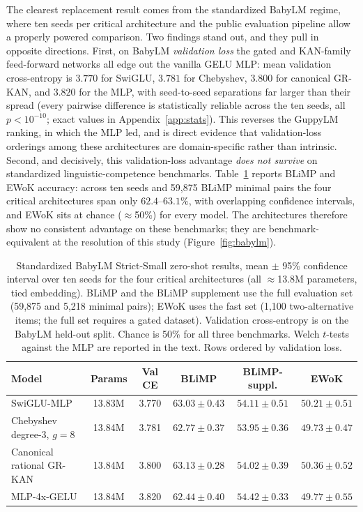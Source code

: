 \documentclass[11pt]{article}
\newcommand{\modelname}[1]{\textsc{#1}}
\newcommand{\grkan}{\modelname{GR-KAN}}
\begin{document}
The clearest replacement result comes from the standardized BabyLM regime, where ten seeds per critical architecture and the public evaluation pipeline allow a properly powered comparison. Two findings stand out, and they pull in opposite directions. First, on BabyLM \emph{validation loss} the gated and KAN-family feed-forward networks all edge out the vanilla GELU MLP: mean validation cross-entropy is \(3.770\) for SwiGLU, \(3.781\) for Chebyshev, \(3.800\) for canonical \grkan{}, and \(3.820\) for the MLP, with seed-to-seed separations far larger than their spread (every pairwise difference is statistically reliable across the ten seeds, all \(p<10^{-10}\); exact values in Appendix~\ref{app:stats}). This reverses the GuppyLM ranking, in which the MLP led, and is direct evidence that validation-loss orderings among these architectures are domain-specific rather than intrinsic. Second, and decisively, this validation-loss advantage \emph{does not survive} on standardized linguistic-competence benchmarks. Table~\ref{tab:babylm} reports BLiMP and EWoK accuracy: across ten seeds and 59,875 BLiMP minimal pairs the four critical architectures span only \(62.4\)--\(63.1\%\), with overlapping confidence intervals, and EWoK sits at chance (\(\approx\)50\%) for every model. The architectures therefore show no consistent advantage on these benchmarks; they are benchmark-equivalent at the resolution of this study (Figure~\ref{fig:babylm}).

\begin{table}[t]
\centering
\caption{Standardized BabyLM Strict-Small zero-shot results, mean \(\pm\) 95\% confidence interval over ten seeds for the four critical architectures (all \(\approx\)13.8M parameters, tied embedding). BLiMP and the BLiMP supplement use the full evaluation set (59,875 and 5,218 minimal pairs); EWoK uses the fast set (1,100 two-alternative items; the full set requires a gated dataset). Validation cross-entropy is on the BabyLM held-out split. Chance is 50\% for all three benchmarks. Welch \(t\)-tests against the MLP are reported in the text. Rows ordered by validation loss.}
\label{tab:babylm}
\begin{tabular}{@{}lccccc@{}}
\toprule
Model & Params & Val CE & BLiMP & BLiMP-suppl. & EWoK \\
\midrule
SwiGLU-MLP & 13.83M & 3.770 & \(63.03\pm0.43\) & \(54.11\pm0.51\) & \(50.21\pm0.51\) \\
Chebyshev degree-3, \(g=8\) & 13.84M & 3.781 & \(62.77\pm0.37\) & \(53.95\pm0.36\) & \(49.73\pm0.47\) \\
Canonical rational \grkan{} & 13.84M & 3.800 & \(63.13\pm0.28\) & \(54.02\pm0.39\) & \(50.36\pm0.52\) \\
MLP-4x-GELU & 13.84M & 3.820 & \(62.44\pm0.40\) & \(54.42\pm0.33\) & \(49.77\pm0.55\) \\
\bottomrule
\end{tabular}
\end{table}
\end{document}
